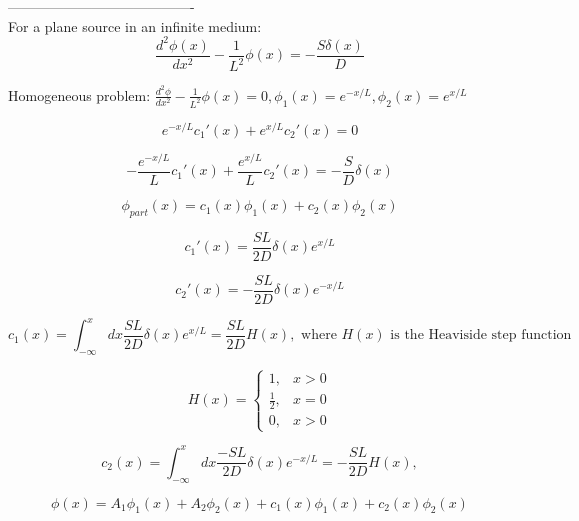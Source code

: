 \documentclass[12pt]{article}
\begin{document}
----------------------------------------\\
For a plane source in an infinite medium:
\begin{equation*}
\frac{d^2\phi(x)}{dx^2} - \frac{1}{L^2}\phi(x) = -\frac{S\delta(x)}{D}
\end{equation*}

Homogeneous problem: $\frac{d^2\phi}{dx^2} - \frac{1}{L^2}\phi(x)=0,\phi_1(x)=e^{-x/L},\phi_2(x)=e^{x/L}$

\begin{equation*}
e^{-x/L}c_1'(x) + e^{x/L}c_2'(x) = 0
\end{equation*}

\begin{equation*}
-\frac{e^{-x/L}}{L}c_1'(x) + \frac{e^{x/L}}{L}c_2'(x) = -\frac{S}{D}\delta(x)
\end{equation*}

\begin{equation*}
\phi_{part}(x) = c_1(x)\phi_1(x) + c_2(x)\phi_2(x)
\end{equation*}

\begin{equation*}
c_1'(x) = \frac{SL}{2D}\delta(x)e^{x/L}
\end{equation*}

\begin{equation*}
c_2'(x) = -\frac{SL}{2D}\delta(x)e^{-x/L}
\end{equation*}

\begin{equation*}
c_1(x) = \int_{-\infty}^x dx\frac{SL}{2D}\delta(x)e^{x/L} = \frac{SL}{2D}H(x),
\text{ where $H(x)$ is the Heaviside step function}
\end{equation*}

\begin{equation*}
  H(x)=\begin{cases}
    1, & x > 0 \\
    \tfrac{1}{2}, & x = 0 \\
    0, & x > 0
  \end{cases}
\end{equation*}

\begin{equation*}
c_2(x) = \int_{-\infty}^x dx\frac{-SL}{2D}\delta(x)e^{-x/L} = -\frac{SL}{2D}H(x),
\end{equation*}

\begin{equation*}
\phi(x) = A_1\phi_1(x) + A_2\phi_2(x) + c_1(x)\phi_1(x) + c_2(x)\phi_2(x)
\end{equation*}
\end{document}
